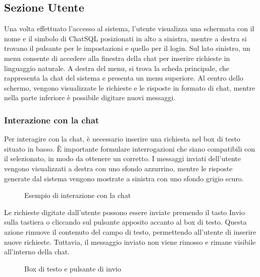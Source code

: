 \subsection{Sezione Utente}
\label{sec:sezUtente}

\par Una volta effettuato l'accesso al sistema, l'utente visualizza una schermata con il nome e il simbolo di ChatSQL posizionati in alto a sinistra, mentre a destra si trovano il pulsante per le impostazioni e quello per il login. Sul lato sinistro, un menu consente di accedere alla finestra della chat per inserire richieste in linguaggio naturale. A destra del menu, si trova la scheda principale, che rappresenta la chat del sistema e presenta un menu superiore. Al centro dello schermo, vengono visualizzate le richieste e le risposte in formato di chat, mentre nella parte inferiore è possibile digitare nuovi messaggi.

\subsubsection{Interazione con la chat}

\par Per interagire con la chat, è necessario inserire una richiesta nel box di testo situato in basso. È importante formulare interrogazioni che siano compatibili con il  selezionato, in modo da ottenere un  corretto. I messaggi inviati dell'utente vengono visualizzati a destra con uno sfondo azzurrino, mentre le risposte generate dal sistema vengono mostrate a sinistra con uno sfondo grigio scuro.

\begin{figure}[H]
  \centering
  \caption{Esempio di interazione con la chat}
\end{figure}

\par Le richieste digitate dall'utente possono essere inviate premendo il tasto Invio sulla tastiera o cliccando sul pulsante apposito accanto al box di testo. Questa azione rimuove il contenuto del campo di testo, permettendo all'utente di inserire nuove richieste. Tuttavia, il messaggio inviato non viene rimosso e rimane visibile all'interno della chat.

\begin{figure}[H]
  \centering
  \caption{Box di testo e pulsante di invio}
\end{figure}

